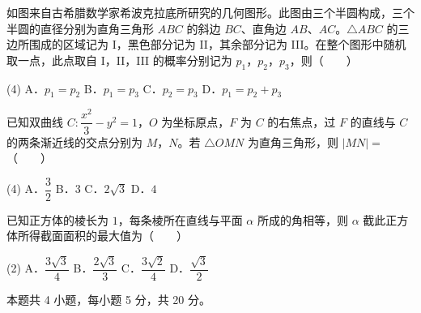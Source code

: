 \begin{question}
如图来自古希腊数学家希波克拉底所研究的几何图形。此图由三个半圆构成，三个半圆的直径分别为直角三角形 $ABC$ 的斜边 $BC$、直角边 $AB$、$AC$。$\triangle ABC$ 的三边所围成的区域记为 I，黑色部分记为 II，其余部分记为 III。在整个图形中随机取一点，此点取自 I，II，III 的概率分别记为 $p_1$，$p_2$，$p_3$，则\mbox{（　　）}
\nopagebreak[4]
\begin{center}\end{center}
\nopagebreak[4]
\begin{gkopts}(4)
\task A．$p_1=p_2$
\task B．$p_1=p_3$
\task C．$p_2=p_3$
\task D．$p_1=p_2+p_3$
\end{gkopts}

\end{question}
\begin{question}
已知双曲线 $C:\dfrac{x^{2}}3-y^{2}=1$，$O$ 为坐标原点，$F$ 为 $C$ 的右焦点，过 $F$ 的直线与 $C$ 的两条渐近线的交点分别为 $M$，$N$。若 $\triangle OMN$ 为直角三角形，则 $|MN|=$\mbox{（　　）}

\begin{gkopts}(4)
\task A．$\dfrac32$
\task B．$3$
\task C．$2\sqrt3$
\task D．$4$
\end{gkopts}

\end{question}
\begin{question}
已知正方体的棱长为 $1$，每条棱所在直线与平面 $\alpha$ 所成的角相等，则 $\alpha$ 截此正方体所得截面面积的最大值为\mbox{（　　）}

\begin{gkopts}(2)
\task A．$\dfrac{3\sqrt3}4$
\task B．$\dfrac{2\sqrt3}3$
\task C．$\dfrac{3\sqrt2}4$
\task D．$\dfrac{\sqrt3}2$
\end{gkopts}

\par\medskip

\end{question}

\begin{gktip}
本题共 4 小题，每小题 5 分，共 20 分。
\end{gktip}

